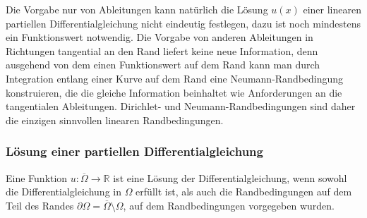 Die Vorgabe nur von Ableitungen kann natürlich die Lösung $u(x)$
einer linearen partiellen Differentialgleichung nicht eindeutig
festlegen, dazu ist noch mindestens ein Funktionswert notwendig.
Die Vorgabe von anderen Ableitungen in Richtungen tangential an den
Rand liefert keine neue Information, denn ausgehend von dem einen
Funktionswert auf dem Rand kann man durch Integration entlang
einer Kurve auf dem Rand eine Neumann-Randbedingung konstruieren,
die die gleiche Information beinhaltet wie Anforderungen an die
tangentialen Ableitungen.
Dirichlet- und Neumann-Randbedingungen sind daher die einzigen
sinnvollen linearen Randbedingungen.

\subsubsection{Lösung einer partiellen Differentialgleichung}
Eine Funktion $u\colon \overline{\Omega}\to\mathbb{R}$ ist
eine Lösung der Differentialgleichung, wenn sowohl die
Differentialgleichung in $\Omega$ erfüllt ist, als auch die
Randbedingungen auf dem Teil des Randes
$\partial \Omega=\overline{\Omega}\setminus \Omega$,
auf dem Randbedingungen vorgegeben wurden.

